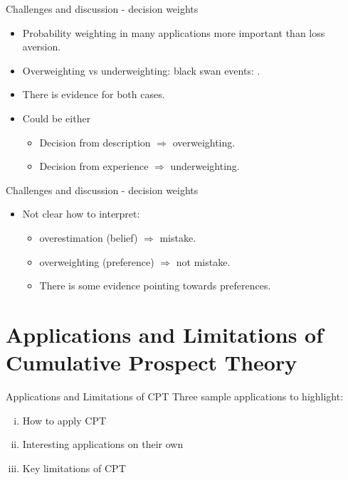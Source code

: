 \documentclass[11pt, aspectratio=169]{beamer}
\begin{document}
      \begin{frame}{Challenges and discussion - decision weights}
    \begin{itemize}
        \item Probability weighting in many applications more important than loss aversion.\medskip
        \item Overweighting vs underweighting: black swan events: \citet{Taleb2010}.\medskip
        \item There is evidence for both cases.\medskip
        \item Could be either \medskip
        \begin{itemize}
        \item Decision from description $\Rightarrow$ overweighting.\smallskip
        \item Decision from experience $\Rightarrow$ underweighting.\smallskip
        \end{itemize}
    \end{itemize}
\end{frame}


\begin{frame}{Challenges and discussion - decision weights}
    \begin{itemize}
        \item Not clear how to interpret:\medskip
          \begin{itemize}
        \item overestimation (belief) $\Rightarrow$ mistake.\smallskip
        \item overweighting (preference) $\Rightarrow$ not mistake.\smallskip
       \item There is some evidence pointing towards preferences.\medskip
           \end{itemize}
    \end{itemize}
\end{frame}

\section{Applications and Limitations of Cumulative Prospect Theory}



\begin{frame}{Applications and Limitations of CPT}
    Three sample applications to highlight:\bigskip
        \begin{enumerate}[i)]
            \item How to apply CPT\bigskip
            \item Interesting applications on their own\bigskip
            \item Key limitations of CPT\bigskip
        \end{enumerate}
    \end{frame}
\end{document}
